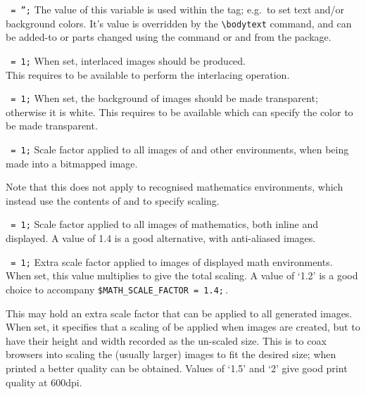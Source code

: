\begin{htmllist}
\item [\fn{\$BODYTEXT}\texttt{ = '';}]
The value of this variable is used within the  tag;
e.g.\ to set text and/or background colors.\html{\\}
It's value is overridden by the \verb|\bodytext| command, 
and can be added-to or parts changed using the  command
or  and  from the  package.


\item [\fn{\$INTERLACE}\texttt{ = 1;}\label{interlace}]
When set, interlaced images should be produced.\\
This requires  to be available 
to perform the interlacing operation.


\item [\fn{\$TRANSPARENT\_FIGURES}\texttt{ = 1;}\label{transfigs}]
When set, the background of images should be made transparent;
otherwise it is white.\html{\\}
This requires  %
to be available which can specify the color to be made transparent.


\item [\fn{\$FIGURE\_SCALE\_FACTOR}\texttt{ = 1;}\label{figscale}]
Scale factor applied to all images of  and other environments, 
when being made into a bitmapped image.

\smallskip\noindent
Note that this does not apply to recognised mathematics environments, 
which instead use the contents of  
and  to specify scaling.


\item [\fn{\$MATH\_SCALE\_FACTOR}\texttt{ = 1;}\label{mathscale}]
Scale factor applied to all images of mathematics, both inline
and displayed. 
A value of 1.4 is a good alternative, with anti-aliased images.


\item [\fn{\$DISP\_SCALE\_FACTOR}\texttt{ = 1;}\label{dispscale}]
Extra scale factor applied to images of displayed math environments.\html{\\}
When set, this value multiplies 
to give the total scaling. 
A value of `1.2' is a good choice to accompany \verb|$MATH_SCALE_FACTOR = 1.4;|\,.


\item [\fn{\$EXTRA\_IMAGE\_SCALE}\label{ximagescale}]
This may hold an extra scale factor that can be applied to all generated images.\html{\\}
When set, it specifies that a scaling of  be applied 
when images are created, but to have their height and width recorded 
as the un-scaled size. This is to coax browsers into scaling the (usually larger) 
images to fit the desired size; when printed a better quality can be obtained.
Values of `1.5' and `2' give good print quality at 600dpi.



\end{htmllist}
